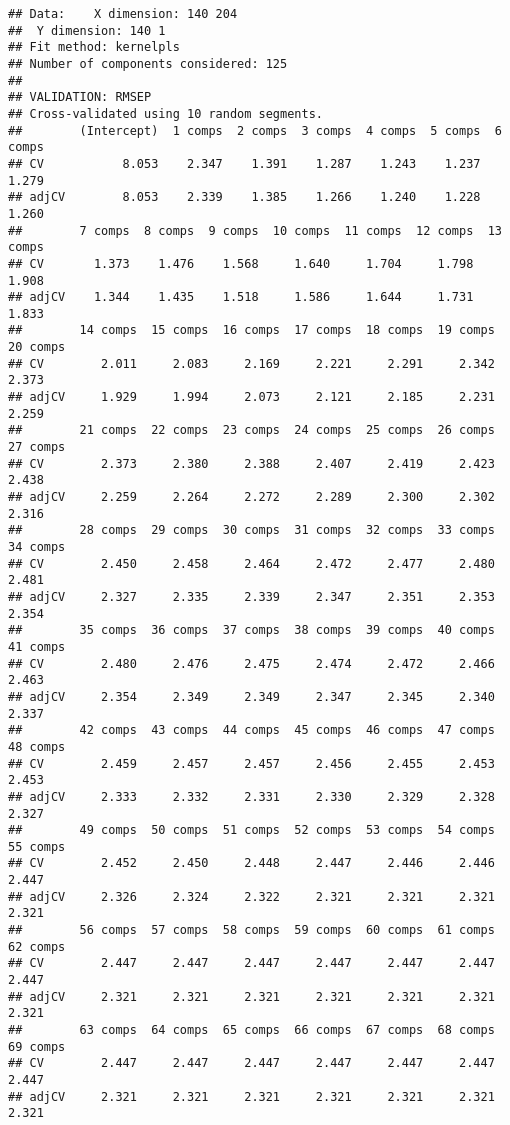 \documentclass[
]{article}
\begin{document}
\begin{verbatim}
## Data:    X dimension: 140 204 
##  Y dimension: 140 1
## Fit method: kernelpls
## Number of components considered: 125
## 
## VALIDATION: RMSEP
## Cross-validated using 10 random segments.
##        (Intercept)  1 comps  2 comps  3 comps  4 comps  5 comps  6 comps
## CV           8.053    2.347    1.391    1.287    1.243    1.237    1.279
## adjCV        8.053    2.339    1.385    1.266    1.240    1.228    1.260
##        7 comps  8 comps  9 comps  10 comps  11 comps  12 comps  13 comps
## CV       1.373    1.476    1.568     1.640     1.704     1.798     1.908
## adjCV    1.344    1.435    1.518     1.586     1.644     1.731     1.833
##        14 comps  15 comps  16 comps  17 comps  18 comps  19 comps  20 comps
## CV        2.011     2.083     2.169     2.221     2.291     2.342     2.373
## adjCV     1.929     1.994     2.073     2.121     2.185     2.231     2.259
##        21 comps  22 comps  23 comps  24 comps  25 comps  26 comps  27 comps
## CV        2.373     2.380     2.388     2.407     2.419     2.423     2.438
## adjCV     2.259     2.264     2.272     2.289     2.300     2.302     2.316
##        28 comps  29 comps  30 comps  31 comps  32 comps  33 comps  34 comps
## CV        2.450     2.458     2.464     2.472     2.477     2.480     2.481
## adjCV     2.327     2.335     2.339     2.347     2.351     2.353     2.354
##        35 comps  36 comps  37 comps  38 comps  39 comps  40 comps  41 comps
## CV        2.480     2.476     2.475     2.474     2.472     2.466     2.463
## adjCV     2.354     2.349     2.349     2.347     2.345     2.340     2.337
##        42 comps  43 comps  44 comps  45 comps  46 comps  47 comps  48 comps
## CV        2.459     2.457     2.457     2.456     2.455     2.453     2.453
## adjCV     2.333     2.332     2.331     2.330     2.329     2.328     2.327
##        49 comps  50 comps  51 comps  52 comps  53 comps  54 comps  55 comps
## CV        2.452     2.450     2.448     2.447     2.446     2.446     2.447
## adjCV     2.326     2.324     2.322     2.321     2.321     2.321     2.321
##        56 comps  57 comps  58 comps  59 comps  60 comps  61 comps  62 comps
## CV        2.447     2.447     2.447     2.447     2.447     2.447     2.447
## adjCV     2.321     2.321     2.321     2.321     2.321     2.321     2.321
##        63 comps  64 comps  65 comps  66 comps  67 comps  68 comps  69 comps
## CV        2.447     2.447     2.447     2.447     2.447     2.447     2.447
## adjCV     2.321     2.321     2.321     2.321     2.321     2.321     2.321

\end{verbatim}
\end{document}
